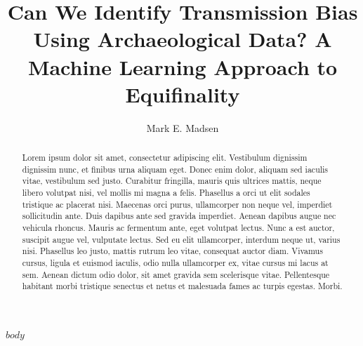 \documentclass[reprint,titlepage,authoryear,times,12pt]{elsarticle}
\def\doctitle{Can We Identify Transmission Bias Using Archaeological Data?  A Machine Learning Approach to Equifinality}
\begin{document}
\newtheorem{resquestion}{Research Question}



\begin{frontmatter}


\title{\doctitle{}}


\author{Mark E. Madsen}

\address{Department of Anthropology, Box 353100, University of Washington, Seattle WA, 98195 USA}

\begin{abstract}
Lorem ipsum dolor sit amet, consectetur adipiscing elit. Vestibulum dignissim dignissim nunc, et finibus urna aliquam eget. Donec enim dolor, aliquam sed iaculis vitae, vestibulum sed justo. Curabitur fringilla, mauris quis ultrices mattis, neque libero volutpat nisi, vel mollis mi magna a felis. Phasellus a orci ut elit sodales tristique ac placerat nisi. Maecenas orci purus, ullamcorper non neque vel, imperdiet sollicitudin ante. Duis dapibus ante sed gravida imperdiet. Aenean dapibus augue nec vehicula rhoncus. Mauris ac fermentum ante, eget volutpat lectus. Nunc a est auctor, suscipit augue vel, vulputate lectus. Sed eu elit ullamcorper, interdum neque ut, varius nisi. Phasellus leo justo, mattis rutrum leo vitae, consequat auctor diam. Vivamus cursus, ligula et euismod iaculis, odio nulla ullamcorper ex, vitae cursus mi lacus at sem. Aenean dictum odio dolor, sit amet gravida sem scelerisque vitae. Pellentesque habitant morbi tristique senectus et netus et malesuada fames ac turpis egestas. Morbi.\end{abstract}








\end{frontmatter}

\clearpage
%



$body$


\end{document}
